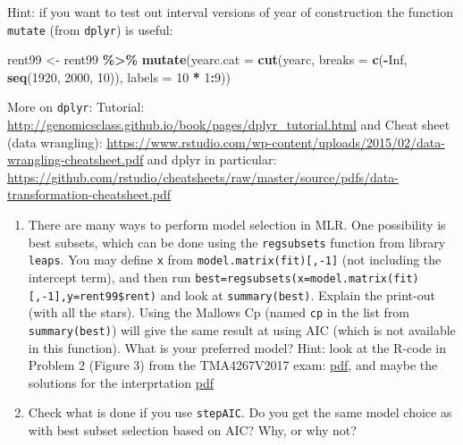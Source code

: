 \documentclass[
]{article}
\newenvironment{Shaded}{\begin{snugshade}}{\end{snugshade}}
\newcommand{\AttributeTok}[1]{\textcolor[rgb]{0.13,0.29,0.53}{#1}}
\newcommand{\ConstantTok}[1]{\textcolor[rgb]{0.56,0.35,0.01}{#1}}
\newcommand{\DecValTok}[1]{\textcolor[rgb]{0.00,0.00,0.81}{#1}}
\newcommand{\FunctionTok}[1]{\textcolor[rgb]{0.13,0.29,0.53}{\textbf{#1}}}
\newcommand{\NormalTok}[1]{#1}
\newcommand{\OtherTok}[1]{\textcolor[rgb]{0.56,0.35,0.01}{#1}}
\newcommand{\SpecialCharTok}[1]{\textcolor[rgb]{0.81,0.36,0.00}{\textbf{#1}}}
\begin{document}
Hint: if you want to test out interval versions of year of construction
the function \texttt{mutate} (from \texttt{dplyr}) is useful:

\begin{Shaded}
\begin{Highlighting}[]
\NormalTok{rent99 }\OtherTok{\textless{}{-}}\NormalTok{ rent99 }\SpecialCharTok{\%\textgreater{}\%}
    \FunctionTok{mutate}\NormalTok{(}\AttributeTok{yearc.cat =} \FunctionTok{cut}\NormalTok{(yearc, }\AttributeTok{breaks =} \FunctionTok{c}\NormalTok{(}\SpecialCharTok{{-}}\ConstantTok{Inf}\NormalTok{, }\FunctionTok{seq}\NormalTok{(}\DecValTok{1920}\NormalTok{, }\DecValTok{2000}\NormalTok{, }\DecValTok{10}\NormalTok{)),}
        \AttributeTok{labels =} \DecValTok{10} \SpecialCharTok{*} \DecValTok{1}\SpecialCharTok{:}\DecValTok{9}\NormalTok{))}
\end{Highlighting}
\end{Shaded}

More on \texttt{dplyr}: Tutorial:
\url{http://genomicsclass.github.io/book/pages/dplyr_tutorial.html} and
Cheat sheet (data wrangling):
\url{https://www.rstudio.com/wp-content/uploads/2015/02/data-wrangling-cheatsheet.pdf}
and dplyr in particular:
\url{https://github.com/rstudio/cheatsheets/raw/master/source/pdfs/data-transformation-cheatsheet.pdf}

\begin{enumerate}
\def\labelenumi{\arabic{enumi}.}
\setcounter{enumi}{1}
\item
  There are many ways to perform model selection in MLR. One possibility
  is best subsets, which can be done using the \texttt{regsubsets}
  function from library \texttt{leaps}. You may define \texttt{x} from
  \texttt{model.matrix(fit){[},-1{]}} (not including the intercept
  term), and then run
  \texttt{best=regsubsets(x=model.matrix(fit){[},-1{]},y=rent99\$rent)}
  and look at \texttt{summary(best)}. Explain the print-out (with all
  the stars). Using the Mallows Cp (named \texttt{cp} in the list from
  \texttt{summary(best)}) will give the same result at using AIC (which
  is not available in this function). What is your preferred model?
  Hint: look at the R-code in Problem 2 (Figure 3) from the TMA4267V2017
  exam:
  \href{https://www.math.ntnu.no/emner/TMA4267/2017v/Exam/eV2017Enew.pdf}{pdf},
  and maybe the solutions for the interprtation
  \href{https://www.math.ntnu.no/emner/TMA4267/2017v/Exam/mergedLFV2017.pdf}{pdf}
\item
  Check what is done if you use \texttt{stepAIC}. Do you get the same
  model choice as with best subset selection based on AIC? Why, or why
  not?
\end{enumerate}
\end{document}
